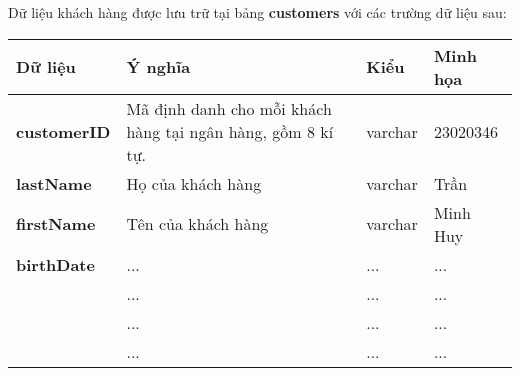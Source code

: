 


Dữ liệu khách hàng được lưu trữ tại bảng \textbf{customers} với các trường dữ liệu sau:

\renewcommand{\arraystretch}{2} %
\setlength{\tabcolsep}{10pt}

\begin{center}
    \begin{tabular}{ | m{7em} | m{15em}| m{5em} | m{5em} | } 
    \hline
    \rowcolor{gray!30}
    Dữ liệu & Ý nghĩa & Kiểu & Minh họa \\ 

    \hline
    \textbf{customerID} &
    Mã định danh cho mỗi khách hàng tại ngân hàng, gồm 8 kí tự. &
    varchar &
    23020346 \\

    \hline
    \textbf{lastName} &
    Họ của khách hàng &
    varchar &
    Trần \\

    \hline
    \textbf{firstName} &
    Tên của khách hàng &
    varchar &
    Minh Huy \\

    \hline
    \textbf{birthDate} &
    ... &
    ... &
    ... \\

    \hline
    \textbf{} &
    ... &
    ... &
    ... \\

    \hline
    \textbf{} &
    ... &
    ... &
    ... \\

    \hline
    \textbf{} &
    ... &
    ... &
    ... \\

    \hline
    \end{tabular}
\end{center}
    